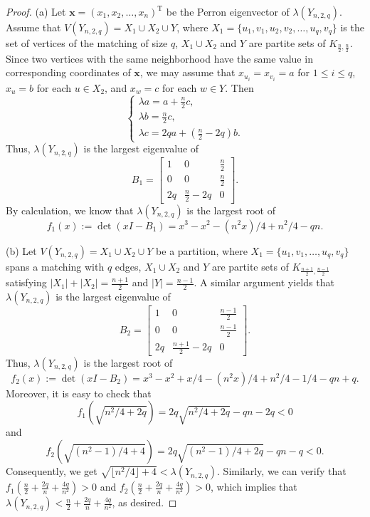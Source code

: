 \documentclass[11pt]{article}
\begin{document}
\begin{proof}
(a) Let $\bm{x}=(x_1,x_2,\ldots ,x_n)^{\mathrm{T}}$ be the Perron eigenvector of $\lambda(Y_{n,2,q})$.
Assume that $V(Y_{n,2,q} )=
X_1 \cup X_2 \cup Y$, where $X_1=\{u_1,v_1,u_2,v_2,\ldots,u_q,v_q \}$ is the set of  vertices of the matching of size $q$, $X_1\cup X_2$ and $Y$ are partite sets of $K_{\frac{n}{2}, \frac{n}{2}}$.
Since two vertices with the same neighborhood have the same value in corresponding coordinates of $\bm{x}$,  we may assume that
$x_{u_i}=x_{v_i}=a$ for $1\le i\le q$, $x_u=b$ for each $u\in X_2$, and $x_w=c$
for each $w\in Y$. Then
\[  \begin{cases}
\lambda a= a + \frac{n}{2} c, \\
\lambda b = \frac{n}{2}c, \\
\lambda c = 2qa + (\frac{n}{2}-2q)b.
\end{cases} \]
Thus, $\lambda(Y_{n,2,q})$ is the largest eigenvalue of
\[  B_1 =  \begin{bmatrix}
1 & 0 & \frac{n}{2} \\
0 & 0 & \frac{n}{2} \\
2q & \frac{n}{2}-2q & 0
\end{bmatrix}.  \]
By calculation, we know that $\lambda(Y_{n,2,q})$ is the largest  root of
\[ f_1(x) := \det (xI - B_1 ) 
=x^3 - x^2 - (n^2 x)/4 + n^2/4 - q n.  \]




(b) Let $V(Y_{n,2,q}) = X_1\cup X_2\cup Y$ be a partition, 
where $X_1=\{u_1,v_1,\ldots ,u_q,v_q\}$ spans a matching with 
$q$ edges, $X_1\cup X_2$ and $Y$
are partite sets of $K_{\frac{n+1}{2}, \frac{n-1}{2}}$
satisfying $|X_1| + |X_2|= \frac{n+1}{2}$
and $|Y|=\frac{n-1}{2}$. A similar argument yields that
$\lambda (Y_{n,2,q})$ is the largest eigenvalue of
\[  B_2= \begin{bmatrix}
1 & 0 & \frac{n-1}{2} \\
0 & 0 & \frac{n-1}{2} \\
2q & \frac{n+1}{2}- 2q & 0
\end{bmatrix}.  \]
Thus, $\lambda (Y_{n,2,q})$
is the largest root of
\[  f_2(x) := \det (xI - B_2)
=x^3 - x^2 + x/4 - (n^2 x)/4 + n^2/4 -1/4 - q n + q.  \] 
Moreover, it is easy to check that 
\[ f_1(\sqrt{n^2/4 +2q}) = 2q \sqrt{n^2/4 +2q} -qn - 2q <0  \]
and 
\[ f_2(\sqrt{(n^2-1)/4 +4}) 
=2q \sqrt{(n^2-1)/4 +2q} - qn -q <0. \]
Consequently, we get 
$ \sqrt{\lfloor n^2/4 \rfloor  +4} < 
\lambda (Y_{n,2,q}) $. Similarly, we can verify that $f_1(\frac{n}{2} + \frac{2q}{n} + \frac{4q}{n^2}) >0$ and $f_2(\frac{n}{2} + \frac{2q}{n} + \frac{4q}{n^2}) >0$, which implies that 
$\lambda (Y_{n,2,q}) < \frac{n}{2} + \frac{2q}{n} + \frac{4q}{n^2}$, as desired. 
\end{proof}
\end{document}
